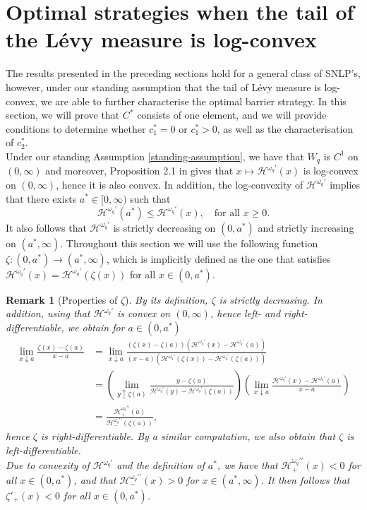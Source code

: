 \documentclass[11pt,reqno]{amsart}
\newtheorem{remark}{Remark}[section]
\newcommand{\cH}{\mathcal{H}}
\newcommand{\homega}{\omega_q}
\newcommand{\PAR}[1]{{{\left(#1\right)}}} %
\renewcommand{\leq}{\leqslant}
\renewcommand{\geq}{\geqslant}
\begin{document}
\section{Optimal strategies when the tail of the L\'evy measure is log-convex}\label{Sec:Optim:Convex}
The results presented in the preceding sections hold for a general class of SNLP's, however, under our standing assumption that the tail of L\'evy measure is log-convex, we are able to further characterise the optimal barrier strategy. In this section, we will prove that $C^\ast$ consists of one element, and we will provide conditions to determine whether $c_1^\ast = 0$ or $c_1^\ast > 0$, as well as the characterisation of $c^\ast_2$.\\
Under our standing Assumption \ref{standing-assumption}, we have that $W_q$ is $C^1$ on $(0,\infty)$ and moreover, Proposition 2.1 in \cite{mata-renaud_2024} gives that $x \mapsto \cH^{\homega\prime}(x)$ is log-convex on $(0,\infty)$, hence it is also convex. In addition, the log-convexity of $\cH^{\homega\prime}$ implies that there exists $a^\ast \in [0,\infty)$ such that
\[
\cH^{\homega\prime}(a^\ast) \leq \cH^{\homega\prime}(x), \quad \text{for all } x\geq 0.
\]
It also follows that $\cH^{\homega\prime}$ is strictly decreasing on $(0,a^\ast)$ and strictly increasing on $(a^\ast,\infty)$. Throughout this section we will use the following function $\zeta : (0,a^\ast) \to (a^\ast,\infty)$, which is implicitly defined as the one that satisfies $\cH^{\homega\prime}(x) = \cH^{\homega\prime}(\zeta(x))$ for all $x \in (0,a^\ast)$.
\begin{remark}[Properties of $\zeta$]
	By its definition, $\zeta$ is strictly decreasing. In addition, using that $\cH^{\homega\prime}$ is convex on $(0,\infty)$, hence left- and right-differentiable, we obtain for $a \in (0,a^\ast)$
	\begin{align*}
		\lim_{x \downarrow a} \frac{\zeta(x)-\zeta(a)}{x-a} &= \lim_{x\downarrow a}\frac{(\zeta(x)-\zeta(a))(\cH^{\homega\prime}(x) - \cH^{\homega\prime}(a))}{(x-a)(\cH^{\homega\prime}(\zeta(x)) - \cH^{\homega\prime}(\zeta(a)))}\\
		&= \PAR{\lim_{y \uparrow \zeta(a)}\frac{y - \zeta(a)}{\cH^{\homega\prime}(y) - \cH^{\homega\prime}(\zeta(a))} }\PAR{\lim_{x\downarrow a}\frac{ \cH^{\homega\prime}(x) - \cH^{\homega\prime}(a) }{x-a}}\\
		&= \frac{\cH^{\homega\prime\prime}_+(a)}{\cH^{\homega\prime\prime}_-(\zeta(a))},
	\end{align*}
	hence $\zeta$ is right-differentiable. By a similar computation, we also obtain that $\zeta$ is left-differentiable.\\
	Due to convexity of $\cH^{\homega\prime}$ and the definition of $a^\ast$, we have that $\cH^{\homega\prime\prime}_+(x)<0$ for all $x \in (0,a^\ast)$, and that $\cH^{\homega\prime\prime}_-(x)>0$ for $x \in (a^\ast,\infty)$. It then follows that $\zeta'_+(x) < 0$ for all $x \in (0,a^\ast)$.\\
\end{remark}
\end{document}
